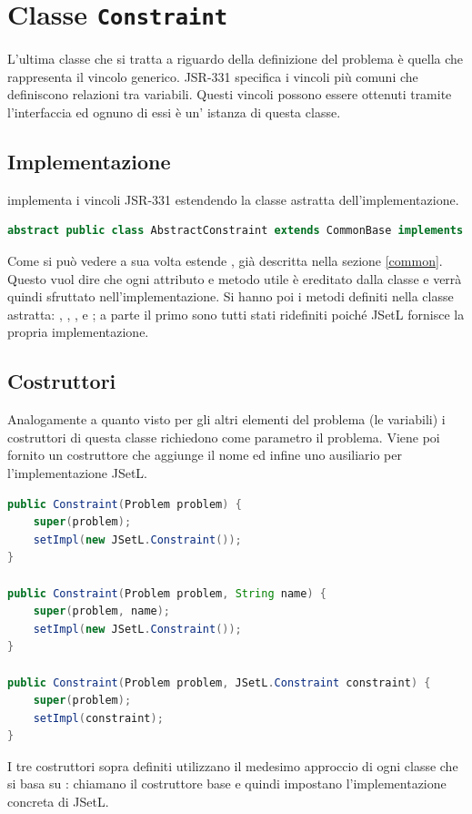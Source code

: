 \section{Classe \texttt{Constraint}}\label{constraint}
L'ultima classe che si tratta a riguardo della definizione del problema è
quella che rappresenta il vincolo generico. JSR-331 specifica i vincoli più
comuni che definiscono relazioni tra variabili. Questi vincoli
possono essere ottenuti tramite l'interfaccia  ed ognuno di
essi è un' istanza di questa classe.

\subsection{Implementazione}
 implementa i vincoli JSR-331 estendendo la classe
astratta dell'implementazione.
\begin{lstlisting}[language = Java,frame = single]
abstract public class AbstractConstraint extends CommonBase implements javax.constraints.Constraint {
\end{lstlisting}
Come si può vedere  a sua volta estende 
, già descritta nella sezione \ref{common}. Questo vuol dire 
che ogni attributo e metodo utile è ereditato dalla classe e verrà quindi 
sfruttato nell'implementazione. Si hanno poi i metodi definiti nella classe 
astratta: ,  ,  ,   e
 ; a parte il primo sono tutti stati ridefiniti poiché JSetL
fornisce la propria implementazione.

\subsection{Costruttori}
Analogamente a quanto visto per gli altri elementi del problema (le variabili)
i costruttori di questa classe richiedono come parametro il problema.
Viene poi fornito un costruttore che aggiunge il nome ed infine uno ausiliario
per l'implementazione JSetL.

\begin{lstlisting}[language = Java,
                   caption = {i costruttori.}]
public Constraint(Problem problem) {
	super(problem);
	setImpl(new JSetL.Constraint());
}

public Constraint(Problem problem, String name) {
	super(problem, name);
	setImpl(new JSetL.Constraint());
}

public Constraint(Problem problem, JSetL.Constraint constraint) {
	super(problem);
	setImpl(constraint);
}
\end{lstlisting}
I tre costruttori sopra definiti utilizzano il medesimo approccio di ogni
classe che si basa su : chiamano il costruttore base e
quindi impostano l'implementazione concreta di JSetL.

